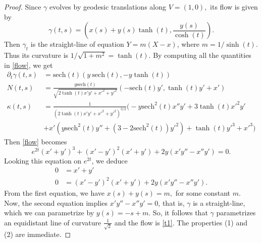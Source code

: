 \documentclass[12pt]{amsart}
\theoremstyle{plain}
\theoremstyle{definition}
\begin{document}
 
 \begin{proof}
Since $\gamma$ evolves by geodesic translations along $V = (1,0),$ its flow is given by 
$$\gamma(t,s) = (x(s) + y(s) \tanh(t), \frac{y(s)}{\cosh(t)}).$$ 
Then $\gamma_t$ is the straight-line of equation $Y=m(X-x)$, where $m=1/\sinh(t)$. Thus its curvature is $1/\sqrt{1+m^2}=\tanh(t)$. By computing all the quantities in \eqref{flow}, we get 
\begin{equation*}
\begin{split}
\partial_t \gamma(t,s) &=\text{sech}(t) \left(y\ \text{sech}(t),-y \tanh (t)  \right) \\
N(t,s) &=\frac{y\text{sech}(t)}{\sqrt{2 \tanh (t) x' y'+x'^2+y'^2}}  \left(-\text{sech}(t)y' ,\tanh (t) y'+x'   \right)\\
\kappa(t,s)&=\frac{1}{\left(2 \tanh (t) x' y'+x'^2+y'^2\right)^{3/2}}\Big( -y \text{sech}^2(t) x'' y'+3 \tanh (t) x'^2 y'\\
&+x' \left(y \text{sech}^2(t) y''+\left(3-2 \text{sech}^2(t)\right) y'^2\right)+\tanh (t) y'^3+x'^3\Big)
\end{split}
\end{equation*}
Then \eqref{flow} becomes
$$e^{2 t} \left(x'+y'\right)^3+\left(x'-y'\right)^2 \left(x'+y'\right)+2 y \left(x' y''-x'' y'\right)=0.$$
Looking this equation on $e^{2t}$, we deduce  
\begin{equation*}
\begin{split}
0&= x'+y'\\
0&= \left(x'-y'\right)^2 \left(x'+y'\right)+2 y \left(x' y''-x'' y'\right).
\end{split}
\end{equation*}
From the first equation, we have  $x(s)+y(s) = m,$ for some constant  $m$. Now, the second equation implies $x' y''-x'' y'=0$, that is, $\gamma$ is a straight-line, which we can parametrize by $y(s)=-s+m$.  So, it follows that $\gamma$ parametrizes an equidistant line of curvature $\frac{1}{\sqrt{2}}$ and the flow is \eqref{t1}. 
The properties   (1) and (2) are immediate.

 \end{proof}
 
\end{document}
